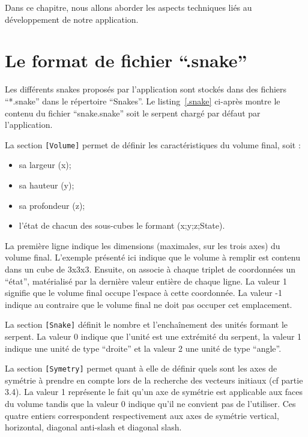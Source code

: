Dans ce chapitre, nous allons aborder les aspects techniques liés au développement de notre application.

\section{Le format de fichier ``.snake''}
Les différents snakes proposés par l'application sont stockés dans des fichiers ``*.snake'' dans le répertoire ``Snakes''. Le listing~\ref{.snake} ci-après montre le contenu du fichier ``snake.snake'' soit le serpent chargé par défaut par l'application.\newline

La section \verb|[Volume]| permet de définir les caractéristiques du volume final, soit :
\begin{itemize}
 \item sa largeur (x);
 \item sa hauteur (y);
 \item sa profondeur (z);
 \item l'état de chacun des sous-cubes le formant (x;y;z;State).
\end{itemize}

La première ligne indique les dimensions (maximales, sur les trois axes) du volume final. L'exemple présenté ici indique que le volume à remplir est contenu dans un cube de 3x3x3.
Ensuite, on associe à chaque triplet de coordonnées un ``état'', matérialisé par la dernière valeur entière de chaque ligne. La valeur 1 signifie que le volume final occupe l'espace à cette coordonnée. La valeur -1 indique au contraire que le volume final ne doit pas occuper cet emplacement.\newline

La section \verb|[Snake]| définit le nombre et l’enchaînement des unités formant le serpent. La valeur 0 indique que l'unité est une extrémité du serpent, la valeur 1 indique une unité de type ``droite'' et la valeur 2 une unité de type ``angle''.\newline

La section \verb|[Symetry]| permet quant à elle de définir quels sont les axes de symétrie à prendre en compte lors de la recherche des vecteurs initiaux (cf partie 3.4). La valeur 1 représente le fait qu'un axe de symétrie est applicable aux faces du volume tandis que la valeur 0 indique qu'il ne convient pas de l'utiliser. Ces quatre entiers correspondent respectivement aux axes de symétrie vertical, horizontal, diagonal anti-slash et diagonal slash.

